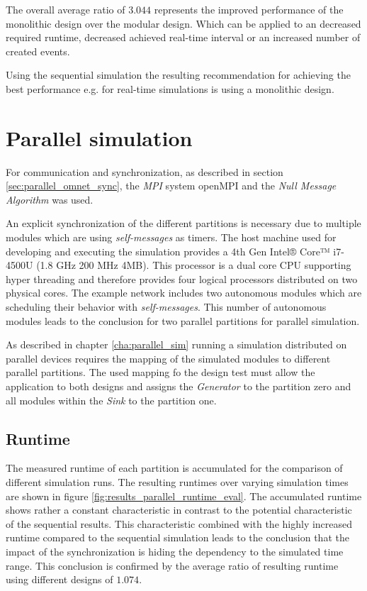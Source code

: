 The overall average ratio of $3.044$ represents the improved performance of the monolithic design over the modular design.
Which can be applied to an decreased required runtime, decreased achieved real-time interval or an increased number of created events.

Using the sequential simulation the resulting recommendation for achieving the best performance e.g. for real-time simulations is using a monolithic design.

\section{Parallel simulation}
\label{sec:measurements_parallel}
For communication and synchronization, as described in section \ref{sec:parallel_omnet_sync}, the \emph{MPI} system openMPI and the \emph{Null Message Algorithm} was used.

An explicit synchronization of the different partitions is necessary due to multiple modules which are using \emph{self-messages} as timers.
The host machine used for developing and executing the simulation provides a 4th Gen Intel® Core™ i7-4500U (1.8 GHz 200 MHz 4MB).
This processor is a dual core CPU supporting hyper threading and therefore provides four logical processors distributed on two physical cores.
The example network includes two autonomous modules which are scheduling their behavior with \emph{self-messages}.
This number of autonomous modules leads to the conclusion for two parallel partitions for parallel simulation.

As described in chapter \ref{cha:parallel_sim} running a simulation distributed on parallel devices requires the mapping of the simulated modules to different parallel partitions.
The used mapping  fo the design test must allow the application to both designs and assigns the \emph{Generator} to the partition zero and all modules within the \emph{Sink} to the partition one.

\subsection{Runtime}
\label{sec:measurements_parallel_runtime}

The measured runtime of each partition is accumulated for the comparison of different simulation runs.
The resulting runtimes over varying simulation times are shown in figure \ref{fig:results_parallel_runtime_eval}.
The accumulated runtime shows rather a constant characteristic in contrast to the potential characteristic of the sequential results.
This characteristic combined with the highly increased runtime compared to the sequential simulation leads to the conclusion that the impact of the synchronization is hiding the dependency to the simulated time range.
This conclusion is confirmed by the average ratio of resulting runtime using different designs of $1.074$.
\\

